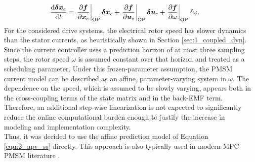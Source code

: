 \begin{align*}
	\frac{\mathrm{d} \bm{\delta x}_c}{\mathrm{d} t}
	&=
	\left.
	\frac{\partial\bm{f}}{\partial\bm{x}_c}
	\right|_{\mathrm{OP}}
	\bm{\delta x}_c
	+
	\left.
	\frac{\partial\bm{f}}{\partial\bm{u}_c}
	\right|_{\mathrm{OP}}
	\bm{\delta u}_c
	+
	\left.
	\frac{\partial\bm{f}}{\partial\omega}
	\right|_{\mathrm{OP}}
	\delta\omega .
\end{align*}
For the considered drive systems, the electrical rotor speed has slower dynamics than the stator currents, as heuristically shown in Section \ref{sec:1_coupled_dyn}. Since the current controller uses a prediction horizon of at most three sampling steps, the rotor speed $\omega$ is assumed constant over that horizon and treated as a scheduling parameter. Under this frozen-parameter assumption, the PMSM current model can be described as an affine, parameter-varying system in $\omega$. The dependence on the speed, which is assumed to be slowly varying, appears both in the cross-coupling terms of the state matrix and in the back-EMF term.  Therefore, an additional step-wise linearization is not expected to significantly reduce the online computational burden enough to justify the increase in modeling and implementation complexity.\\
Thus, it was decided to use the affine prediction model of Equation \eqref{equ:2_apv_ss} directly. This approach is also typically used in modern MPC PMSM literature \cite{TOMPFC1} \cite{XuchenPMSMiObs} \cite{ofmpcDistObs}. %

